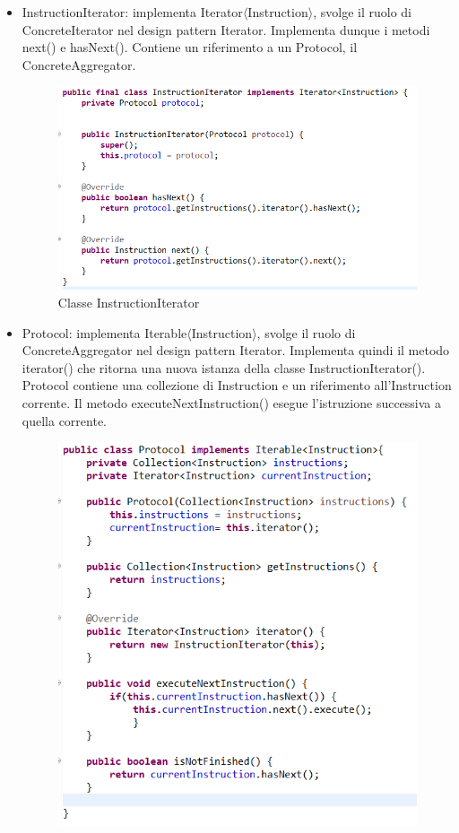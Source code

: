 \documentclass{article}
\begin{document}
\begin{itemize}
\item InstructionIterator: implementa Iterator$\langle$Instruction$\rangle$, svolge il ruolo di ConcreteIterator nel design pattern Iterator. Implementa dunque i metodi next() e hasNext(). Contiene un riferimento a un Protocol, il ConcreteAggregator.
\begin{figure} [H]
\begin{center}
\includegraphics[scale=0.8]{InstructionIterator.png}
\end{center}
\caption{Classe InstructionIterator}
\end{figure}
\item Protocol: implementa Iterable$\langle$Instruction$\rangle$, svolge il ruolo di ConcreteAggregator nel design pattern Iterator. Implementa quindi il metodo iterator() che ritorna una nuova istanza della classe InstructionIterator(). Protocol contiene una collezione di Instruction e un riferimento all'Instruction corrente. Il metodo executeNextInstruction() esegue l'istruzione successiva a quella corrente. 
\begin{figure} [H]
\begin{center}
\includegraphics[scale=0.8]{Protocol.png}

\end{center}
\end{figure}
\end{itemize}
\end{document}
